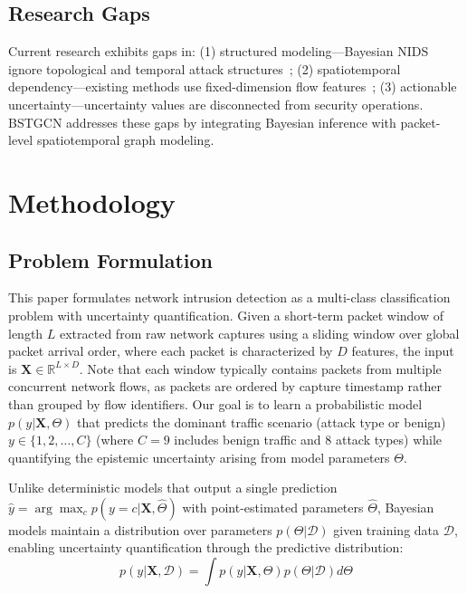 \documentclass[lettersize,journal]{IEEEtran}
\begin{document}
\subsection{Research Gaps}

Current research exhibits gaps in: (1) structured modeling---Bayesian NIDS ignore topological and temporal attack structures~\cite{BCNN-IDS}; (2) spatiotemporal dependency---existing methods use fixed-dimension flow features~\cite{Tabarisaadi2024}; (3) actionable uncertainty---uncertainty values are disconnected from security operations. BSTGCN addresses these gaps by integrating Bayesian inference with packet-level spatiotemporal graph modeling.

\section{Methodology}

\subsection{Problem Formulation}

This paper formulates network intrusion detection as a multi-class classification problem with uncertainty quantification. Given a short-term packet window of length $L$ extracted from raw network captures using a sliding window over global packet arrival order, where each packet is characterized by $D$ features, the input is $\mathbf{X} \in \mathbb{R}^{L \times D}$. Note that each window typically contains packets from multiple concurrent network flows, as packets are ordered by capture timestamp rather than grouped by flow identifiers. Our goal is to learn a probabilistic model $p(y|\mathbf{X}, \Theta)$ that predicts the dominant traffic scenario (attack type or benign) $y \in \{1, 2, \ldots, C\}$ (where $C=9$ includes benign traffic and 8 attack types) while quantifying the epistemic uncertainty arising from model parameters $\Theta$.

Unlike deterministic models that output a single prediction $\hat{y} = \arg\max_c p(y=c|\mathbf{X}, \hat{\Theta})$ with point-estimated parameters $\hat{\Theta}$, Bayesian models maintain a distribution over parameters $p(\Theta|\mathcal{D})$ given training data $\mathcal{D}$, enabling uncertainty quantification through the predictive distribution:
\begin{equation}
p(y|\mathbf{X}, \mathcal{D}) = \int p(y|\mathbf{X}, \Theta) p(\Theta|\mathcal{D}) d\Theta
\end{equation}
\end{document}
